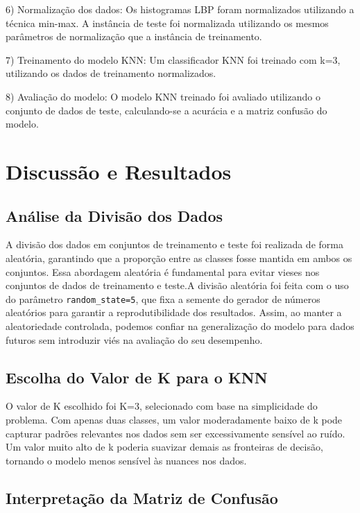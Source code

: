 \documentclass[lettersize,journal]{IEEEtran}
\begin{document}
6) Normalização dos dados: Os histogramas LBP foram normalizados utilizando a técnica min-max. A instância de teste foi normalizada utilizando os mesmos parâmetros de normalização que a instância de treinamento.

7) Treinamento do modelo KNN: Um classificador KNN foi treinado com k=3, utilizando os dados de treinamento normalizados.

8) Avaliação do modelo: O modelo KNN treinado foi avaliado utilizando o conjunto de dados de teste, calculando-se a acurácia e a matriz confusão do modelo.


\section{Discussão e Resultados}

\subsection{Análise da Divisão dos Dados}

A divisão dos dados em conjuntos de treinamento e teste foi realizada de forma aleatória, garantindo que a proporção entre as classes fosse mantida em ambos os conjuntos. Essa abordagem aleatória é fundamental para evitar vieses nos conjuntos de dados de treinamento e teste.A divisão aleatória foi feita com o uso do parâmetro \texttt{random\_state=5}, que fixa a semente do gerador de números aleatórios para garantir a reprodutibilidade dos resultados. Assim, ao manter a aleatoriedade controlada, podemos confiar na generalização do modelo para dados futuros sem introduzir viés na avaliação do seu desempenho.

\subsection{Escolha do Valor de K para o KNN}

O valor de K escolhido foi K=3, selecionado com base na simplicidade do problema. Com apenas duas classes, um valor moderadamente baixo de k pode capturar padrões relevantes nos dados sem ser excessivamente sensível ao ruído. Um valor muito alto de k poderia suavizar demais as fronteiras de decisão, tornando o modelo menos sensível às nuances nos dados.

\subsection{Interpretação da Matriz de Confusão}
\end{document}
